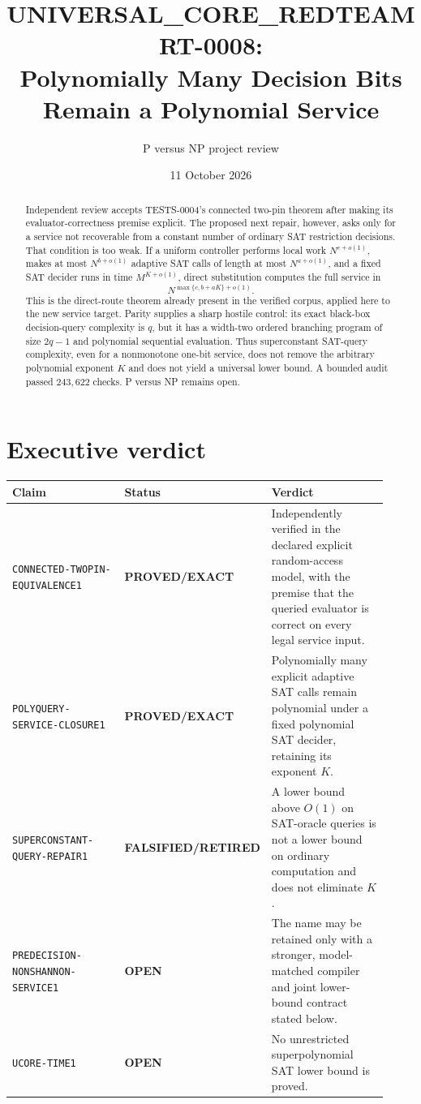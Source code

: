 \documentclass[11pt]{article}
\title{UNIVERSAL\_CORE\_REDTEAM RT-0008:\\
Polynomially Many Decision Bits Remain a Polynomial Service}
\author{P versus NP project review}
\date{11 October 2026}
\newcommand{\EXACT}{\textbf{PROVED/EXACT}}
\newcommand{\OPEN}{\textbf{OPEN}}
\newcommand{\RETIRED}{\textbf{FALSIFIED/RETIRED}}
\begin{document}
\maketitle

\begin{abstract}
Independent review accepts TESTS-0004's connected two-pin theorem after
making its evaluator-correctness premise explicit.  The proposed next repair,
however, asks only for a service not recoverable from a constant number of
ordinary SAT restriction decisions.  That condition is too weak.  If a
uniform controller performs local work $N^{c+o(1)}$, makes at most
$N^{b+o(1)}$ adaptive SAT calls of length at most $N^{a+o(1)}$, and a fixed
SAT decider runs in time $M^{K+o(1)}$, direct substitution computes the full
service in
\[
 N^{\max\{c,b+aK\}+o(1)}.
\]
This is the direct-route theorem already present in the verified corpus,
applied here to the new service target.  Parity supplies a sharp hostile
control: its exact black-box decision-query complexity is $q$, but it has a
width-two ordered branching program of size $2q-1$ and polynomial sequential
evaluation.  Thus superconstant SAT-query complexity, even for a nonmonotone
one-bit service, does not remove the arbitrary polynomial exponent $K$ and
does not yield a universal lower bound.  A bounded audit passed $243{,}622$
checks.  P versus NP remains open.
\end{abstract}

\section{Executive verdict}

\begin{center}
\small
\begin{tabular}{p{0.34\linewidth}p{0.22\linewidth}p{0.36\linewidth}}
\toprule
Claim & Status & Verdict\\
\midrule
\texttt{CONNECTED-TWOPIN-EQUIVALENCE1} & \EXACT &
Independently verified in the declared explicit random-access model, with
the premise that the queried evaluator is correct on every legal service
input.\\
\texttt{POLYQUERY-SERVICE-CLOSURE1} & \EXACT &
Polynomially many explicit adaptive SAT calls remain polynomial under a
fixed polynomial SAT decider, retaining its exponent $K$.\\
\texttt{SUPERCONSTANT-QUERY-REPAIR1} & \RETIRED &
A lower bound above $O(1)$ on SAT-oracle queries is not a lower bound on
ordinary computation and does not eliminate $K$.\\
\texttt{PREDECISION-NONSHANNON-SERVICE1} & \OPEN &
The name may be retained only with a stronger, model-matched compiler and
joint lower-bound contract stated below.\\
\texttt{UCORE-TIME1} & \OPEN &
No unrestricted superpolynomial SAT lower bound is proved.\\
\bottomrule
\end{tabular}
\end{center}
\end{document}
